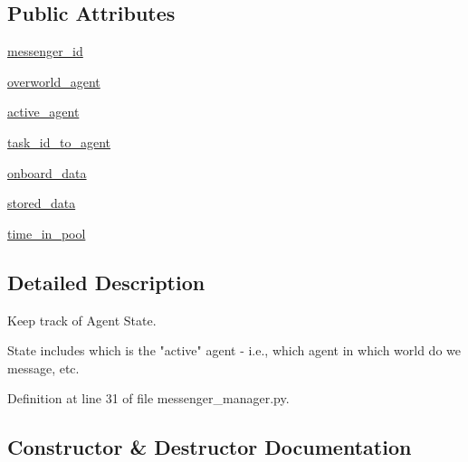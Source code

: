\subsection*{Public Attributes}
\begin{DoxyCompactItemize}
\item 
\hyperlink{classparlai_1_1messenger_1_1core_1_1messenger__manager_1_1AgentState_a5884d2d96a937f7bebd7211e8156e2ff}{messenger\+\_\+id}
\item 
\hyperlink{classparlai_1_1messenger_1_1core_1_1messenger__manager_1_1AgentState_a0c52c5785d252ddcbd2c94c51e369318}{overworld\+\_\+agent}
\item 
\hyperlink{classparlai_1_1messenger_1_1core_1_1messenger__manager_1_1AgentState_a1eaece0dcaec5dbb4150e238ea6fd543}{active\+\_\+agent}
\item 
\hyperlink{classparlai_1_1messenger_1_1core_1_1messenger__manager_1_1AgentState_a287559f680fc55f579b02b738a3051a0}{task\+\_\+id\+\_\+to\+\_\+agent}
\item 
\hyperlink{classparlai_1_1messenger_1_1core_1_1messenger__manager_1_1AgentState_a34e57e62ed2298e004dcd8ef9c443fa4}{onboard\+\_\+data}
\item 
\hyperlink{classparlai_1_1messenger_1_1core_1_1messenger__manager_1_1AgentState_a9a3648a299f6cde0529f345837e5ff74}{stored\+\_\+data}
\item 
\hyperlink{classparlai_1_1messenger_1_1core_1_1messenger__manager_1_1AgentState_a8aa3cfc2885090eb2a5fe3a610094f58}{time\+\_\+in\+\_\+pool}
\end{DoxyCompactItemize}


\subsection{Detailed Description}
\begin{DoxyVerb}Keep track of Agent State.

State includes which is the "active" agent - i.e., which agent in which
world do we message, etc.
\end{DoxyVerb}
 

Definition at line 31 of file messenger\+\_\+manager.\+py.



\subsection{Constructor \& Destructor Documentation}
\mbox{\label{classparlai_1_1messenger_1_1core_1_1messenger__manager_1_1AgentState_a059cfffdf61335710a6cfecd2d360971}} 
